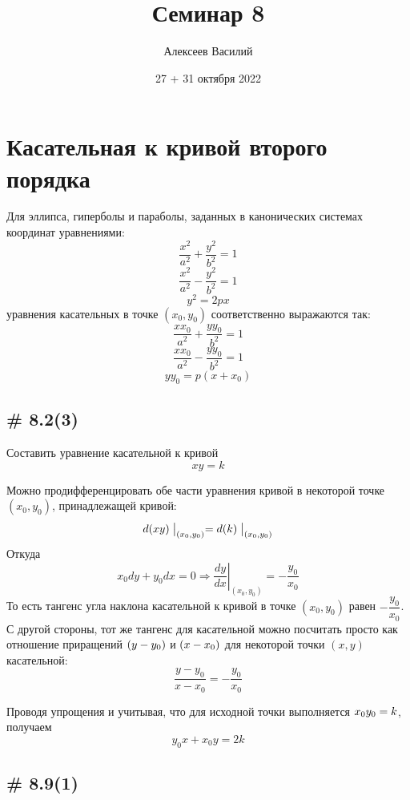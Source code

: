 \documentclass[a4paper,12pt]{article}
\author{Алексеев Василий}
\title{Семинар 8}
\date{27 + 31 октября \inlinegraphics{jack-o-lantern.png} 2022}  %
\begin{document}
  \maketitle
  
  \tableofcontents

  \thispagestyle{empty}
  
  \newpage
  


  \section{Касательная к кривой второго порядка}
  
  Для эллипса, гиперболы и параболы, заданных в канонических системах координат уравнениями:
  \[
    \frac{x^2}{a^2} + \frac{y^2}{b^2} = 1
  \]
  \[
    \frac{x^2}{a^2} - \frac{y^2}{b^2} = 1
  \]
  \[
    y^2 = 2px
  \]
  уравнения касательных в точке $(x_0, y_0)$ соответственно выражаются так:
  \[
    \frac{xx_0}{a^2} + \frac{yy_0}{b^2} = 1
  \]
  \[
    \frac{xx_0}{a^2} - \frac{yy_0}{b^2} = 1
  \]
  \[
    yy_0 = p (x + x_0)
  \]
  
  
  \subsection{\# 8.2(3)}
  
  Составить уравнение касательной к кривой
  \[
    xy = k
  \]

  \begin{solution}
    Можно продифференцировать обе части уравнения кривой в некоторой точке $(x_0, y_0)$, принадлежащей кривой:
    \[
      d(xy)\bigm|_{(x_0, y_0)} = d(k)\bigm|_{(x_0, y_0)}
    \]
    Откуда
    \[
      x_0 dy + y_0 dx = 0 \Rightarrow \left.\frac{dy}{dx}\right|_{(x_0, y_0)} = -\frac{y_0}{x_0}
    \]
    То есть тангенс угла наклона касательной к кривой в точке $(x_0, y_0)$ равен $-\dfrac{y_0}{x_0}$.
    С другой стороны, тот же тангенс для касательной можно посчитать просто как отношение приращений $(y \hm- y_0)$ и $(x \hm- x_0)$ для некоторой точки $(x, y)$ касательной:
    \[
      \frac{y - y_0}{x - x_0} = -\frac{y_0}{x_0}
    \]
    
    Проводя упрощения и учитывая, что для исходной точки выполняется $x_0 y_0 \hm= k$, получаем
    \[
      y_0 x + x_0 y = 2k
    \]
  \end{solution}
  
  
  \subsection{\# 8.9(1)}
  
\end{document}
